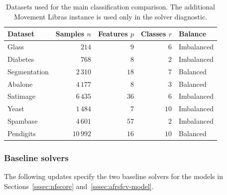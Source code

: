 \documentclass[]{interact}
\theoremstyle{plain}
\theoremstyle{definition}
\theoremstyle{remark}
\begin{document}
\begin{table}[htbp]
\centering
\caption{Datasets used for the main classification comparison. The additional Movement Libras instance is used only in the solver diagnostic.}\label{tab:datasets}
\begin{tabular}{lrrrl}
\toprule
Dataset      & Samples $n$ & Features $p$ & Classes $r$ & Balance    \\
\midrule
Glass        & $214$       & $9$          & $6$         & Imbalanced \\
Diabetes     & $768$       & $8$          & $2$         & Imbalanced \\
Segmentation & $2\,310$    & $18$         & $7$         & Balanced   \\
Abalone      & $4\,177$    & $8$          & $3$         & Balanced   \\
Satimage     & $6\,435$    & $36$         & $6$         & Imbalanced \\
Yeast        & $1\,484$    & $7$          & $10$        & Imbalanced \\
Spambase     & $4\,601$    & $57$         & $2$         & Imbalanced \\
Pendigits    & $10\,992$   & $16$         & $10$        & Balanced   \\
\bottomrule
\end{tabular}
\end{table}
\subsubsection{Baseline solvers}\label{sssec:baselines}
The following updates specify the two baseline solvers for the models in Sections~\ref{sssec:nfscore} and~\ref{sssec:afrsfcv-model}.
\end{document}
